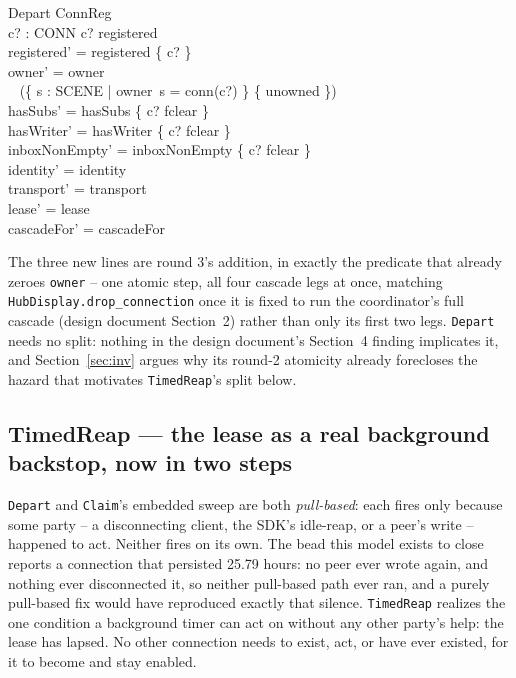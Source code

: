 \documentclass[a4paper,10pt,fleqn]{article}
\begin{document}
\begin{schema}{Depart}
  \Delta ConnReg \\
  c? : CONN
\where
  c? \in registered \\
  registered' = registered \setminus \{ c? \} \\
  owner' = owner \oplus \\
  \quad~ (\{ s : SCENE | owner~s = conn(c?) \} \cross \{ unowned \}) \\
  hasSubs' = hasSubs \oplus \{ c? \mapsto fclear \} \\
  hasWriter' = hasWriter \oplus \{ c? \mapsto fclear \} \\
  inboxNonEmpty' = inboxNonEmpty \oplus \{ c? \mapsto fclear \} \\
  identity' = identity \\
  transport' = transport \\
  lease' = lease \\
  cascadeFor' = cascadeFor
\end{schema}

The three new lines are round 3's addition, in exactly the predicate that
already zeroes \texttt{owner} -- one atomic step, all four cascade legs at
once, matching \texttt{HubDisplay.drop\_connection} once it is fixed to run
the coordinator's full cascade (design document Section~2) rather than only
its first two legs. \texttt{Depart} needs no split: nothing in the design
document's Section~4 finding implicates it, and Section~\ref{sec:inv}
argues why its round-2 atomicity already forecloses the hazard that
motivates \texttt{TimedReap}'s split below.

\subsection{TimedReap --- the lease as a real background backstop, now in
two steps}
\label{sec:timedreap}

\texttt{Depart} and \texttt{Claim}'s embedded sweep are both
\emph{pull-based}: each fires only because some party -- a disconnecting
client, the SDK's idle-reap, or a peer's write -- happened to act.
Neither fires on its own. The bead this model exists to close reports a
connection that persisted 25.79 hours: no peer ever wrote again, and
nothing ever disconnected it, so neither pull-based path ever ran, and a
purely pull-based fix would have reproduced exactly that silence.
\texttt{TimedReap} realizes the one condition a background timer can act on
without any other party's help: the lease has lapsed. No other connection
needs to exist, act, or have ever existed, for it to become and stay
enabled.
\end{document}
